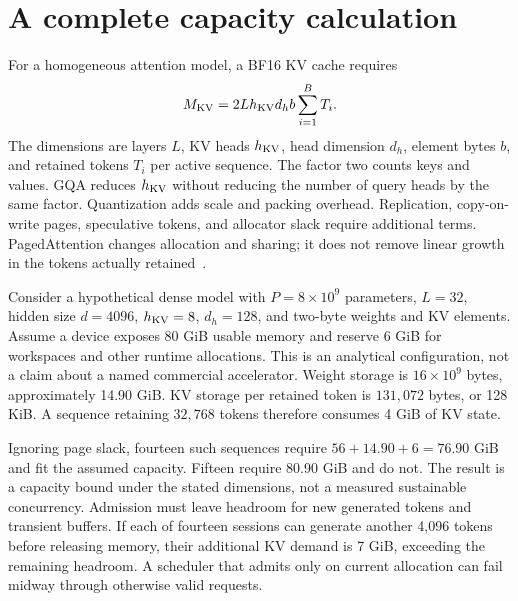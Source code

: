 \section{A complete capacity calculation}\label{sec:C31:02}
For a homogeneous attention model, a BF16 KV cache requires
\begin{equation}
 M_{\rm KV}=2Lh_{\rm KV}d_hb\sum_{i=1}^{B}T_i.
 \label{eq:c31:capacity}
\end{equation}
The dimensions are layers $L$, KV heads $h_{\rm KV}$, head dimension $d_h$, element bytes $b$, and retained tokens $T_i$ per active sequence. The factor two counts keys and values. GQA reduces $h_{\rm KV}$ without reducing the number of query heads by the same factor. Quantization adds scale and packing overhead. Replication, copy-on-write pages, speculative tokens, and allocator slack require additional terms. PagedAttention changes allocation and sharing; it does not remove linear growth in the tokens actually retained~\cite{kwon2023pagedattention}.

Consider a hypothetical dense model with $P=8\times10^9$ parameters, $L=32$, hidden size $d=4096$, $h_{\rm KV}=8$, $d_h=128$, and two-byte weights and KV elements. Assume a device exposes 80 GiB usable memory and reserve 6 GiB for workspaces and other runtime allocations. This is an analytical configuration, not a claim about a named commercial accelerator. Weight storage is $16\times10^9$ bytes, approximately 14.90 GiB. KV storage per retained token is $131{,}072$ bytes, or 128 KiB. A sequence retaining $32{,}768$ tokens therefore consumes 4 GiB of KV state.

Ignoring page slack, fourteen such sequences require $56+14.90+6=76.90$ GiB and fit the assumed capacity. Fifteen require 80.90 GiB and do not. The result is a capacity bound under the stated dimensions, not a measured sustainable concurrency. Admission must leave headroom for new generated tokens and transient buffers. If each of fourteen sessions can generate another 4,096 tokens before releasing memory, their additional KV demand is 7 GiB, exceeding the remaining headroom. A scheduler that admits only on current allocation can fail midway through otherwise valid requests.

